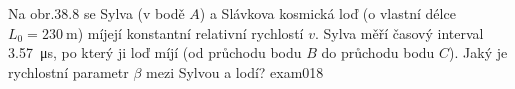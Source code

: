 \begin{fyzexam}{Na obr.38.8 se Sylva (v bodě \(A\)) a Slávkova kosmická loď (o vlastní délce \(L_0 =
  \SI{230}{\m}\)) míjejí konstantní relativní rychlostí \(v\). Sylva měří časový
  interval \SI{3.57}{\micro\s}, po který ji loď míjí (od průchodu bodu \(B\) do průchodu
  bodu \(C\)). Jaký je rychlostní parametr \(β\) mezi Sylvou a lodí?
  \hfill\cite[s.~1015]{Halliday2001}}{exam018} 

  {\centering
  \captionsetup{type=figure}
  \par} 

\end{fyzexam}